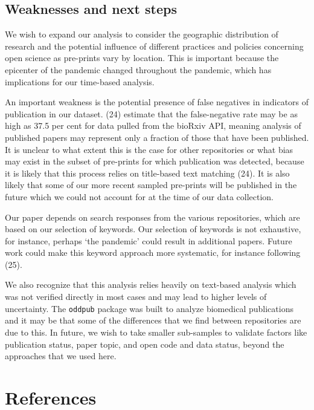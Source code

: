 \documentclass[
]{article}
\begin{document}
\hypertarget{weaknesses-and-next-steps}{%
\subsection{Weaknesses and next steps}\label{weaknesses-and-next-steps}}

We wish to expand our analysis to consider the geographic distribution of research and the potential influence of different practices and policies concerning open science as pre-prints vary by location. This is important because the epicenter of the pandemic changed throughout the pandemic, which has implications for our time-based analysis.

An important weakness is the potential presence of false negatives in indicators of publication in our dataset. (24) estimate that the false-negative rate may be as high as 37.5 per cent for data pulled from the bioRxiv API, meaning analysis of published papers may represent only a fraction of those that have been published. It is unclear to what extent this is the case for other repositories or what bias may exist in the subset of pre-prints for which publication was detected, because it is likely that this process relies on title-based text matching (24). It is also likely that some of our more recent sampled pre-prints will be published in the future which we could not account for at the time of our data collection.

Our paper depends on search responses from the various repositories, which are based on our selection of keywords. Our selection of keywords is not exhaustive, for instance, perhaps `the pandemic' could result in additional papers. Future work could make this keyword approach more systematic, for instance following (25).

We also recognize that this analysis relies heavily on text-based analysis which was not verified directly in most cases and may lead to higher levels of uncertainty. The \texttt{oddpub} package was built to analyze biomedical publications and it may be that some of the differences that we find between repositories are due to this. In future, we wish to take smaller sub-samples to validate factors like publication status, paper topic, and open code and data status, beyond the approaches that we used here.

\newpage

\hypertarget{references}{%
\section*{References}\label{references}}
\end{document}
